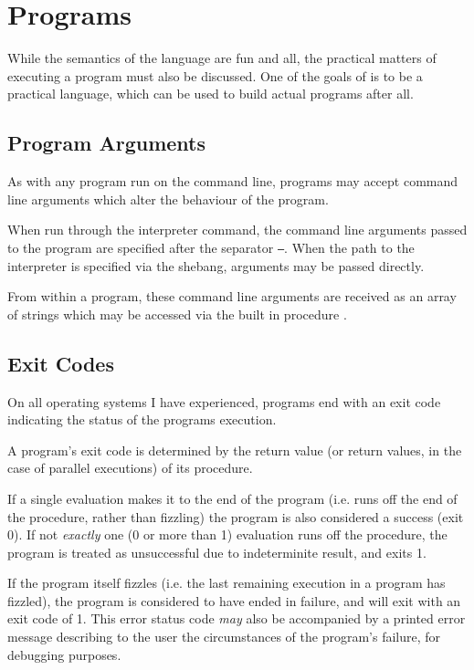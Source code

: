 \section{Programs}

While the semantics of the language are fun and all, the practical matters of
executing a program must also be discussed. One of the goals of \Trilogy{} is
to be a practical language, which can be used to build actual programs after
all.

\subsection{Program Arguments}

As with any program run on the command line, \Trilogy{} programs may accept
command line arguments which alter the behaviour of the program.

When run through the interpreter command, the command line arguments passed
to the \Trilogy{} program are specified after the separator \texttt{--}. When
the path to the \Trilogy{} interpreter is specified via the shebang, arguments
may be passed directly.

From within a \Trilogy{} program, these command line arguments are received
as an array of strings which may be accessed via the built in procedure
.

\subsection{Exit Codes}
\label{sec:exitcode}

On all operating systems I have experienced, programs end with an exit
code indicating the status of the programs execution.

A \Trilogy{} program's exit code is determined by the return value (or
return values, in the case of parallel executions) of its  procedure.


If a single evaluation makes it to the end of the program (i.e. runs off the end of the
 procedure, rather than fizzling) the program is also considered a success (exit 0).
If not \emph{exactly} one (0 or more than 1) evaluation runs off the  procedure,
the program is treated as unsuccessful due to indeterminite result, and exits 1.


If the program itself fizzles (i.e. the last remaining execution in
a program has fizzled), the program is considered to have ended in
failure, and will exit with an exit code of 1. This error status code
\emph{may} also be accompanied by a printed error message describing
to the user the circumstances of the program's failure, for debugging
purposes.

